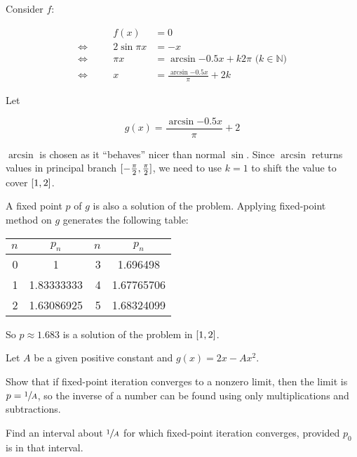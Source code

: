 \documentclass[../../../../Assignments]{subfiles}
\begin{document}
\begin{solution}
    Consider \(f\):

    \begin{align*}
        &\quad&         f(x) &= 0 \\
        \iff&& 2 \sin{\pi x} &= -x \\
        \iff&&         \pi x &= \arcsin{\num{-0.5} x} + k 2 \pi \text{ (\(k \in \mathbb{N}\))} \\
        \iff&&             x &= \frac{\arcsin{\num{-0.5} x}}{\pi} + 2k
    \end{align*}

    Let

    \[g(x) = \frac{\arcsin\num{-0.5} x}{\pi} + 2\]

    \(\arcsin\) is chosen as it ``behaves'' nicer than normal \(\sin\). Since
    \(\arcsin\) returns values in principal branch
    \(\interval{-\frac{\pi}{2}}{\frac{\pi}{2}}\), we need to use \(k = 1\) to
    shift the value to cover \(\interval{1}{2}\).

    A fixed point \(p\) of \(g\) is also a solution of the problem. Applying
    fixed-point method on \(g\) generates the following table:

    \begin{table}[H]
        \centering
        \begin{tabular}{r S[table-format=1.8] r S[table-format=1.8]}
            \toprule
            \(n\)  &   {\(p_n\)}   &  \(n\)  &   {\(p_n\)}   \\
              &  1            &      3  &  1.696498     \\
                1  &  1.83333333   &      4  &  1.67765706   \\
                2  &  1.63086925   &      5  &  1.68324099   \\
            \bottomrule
        \end{tabular}
    \end{table}

    So \(p \approx \num{1.683}\) is a solution of the problem in
    \(\interval{1}{2}\).

\end{solution}

\begin{exercise}
    Let \(A\) be a given positive constant and \(g(x) = 2x - Ax^2\).

    \begin{tasks}
        \task Show that if fixed-point iteration converges to a nonzero limit,
            then the limit is \(p = \sfrac{1}{A}\), so the inverse of a number
            can be found using only multiplications and subtractions.

        \task Find an interval about \(\sfrac{1}{A}\) for which fixed-point
            iteration converges, provided \(p_0\) is in that interval.
    \end{tasks}
\end{exercise}
\end{document}
